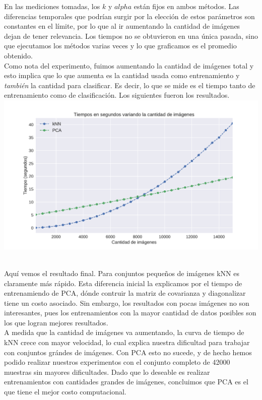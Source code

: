 En las mediciones tomadas, los $k$ y $alpha$ están fijos en ambos métodos. Las diferencias temporales que podrían surgir por la elección de estos parámetros son constantes en el límite, por lo que al ir aumentando la cantidad de imágenes dejan de tener relevancia. Los tiempos no se obtuvieron en una única pasada, sino que ejecutamos los métodos varias veces y lo que graficamos es el promedio obtenido. \\

Como nota del experimento, fuimos aumentando la cantidad de imágenes total y esto implica que lo que aumenta es la cantidad usada como entrenamiento y \textit{también} la cantidad para clasificar. Es decir, lo que se mide es el tiempo tanto de entrenamiento como de clasificación. Los siguientes fueron los resultados. \\

{\centering
    \includegraphics[scale=0.60]{informe/imagenes/tiemposKnnVsPsa.pdf} \\
}
$ $\newline

Aquí vemos el resultado final. Para conjuntos pequeños de imágenes kNN es claramente más rápido. Esta diferencia inicial la explicamos por el tiempo de entrenamiendo de PCA, dónde contruir la matriz de covarianza y diagonalizar tiene un costo asociado. Sin embargo, los resultados con pocas imágenes no son interesantes, pues los entrenamientos con la mayor cantidad de datos posibles son los que logran mejores resultados. \\

A medida que la cantidad de imágenes va aumentando, la curva de tiempo de kNN crece con mayor velocidad, lo cual explica nuestra dificultad para trabajar con conjuntos grándes de imágenes. Con PCA esto no sucede, y de hecho hemos podido realizar nuestros experimentos con el conjunto completo de 42000 muestras sin mayores dificultades. Dado que lo deseable es realizar entrenamientos con cantidades grandes de imágenes, concluimos que PCA es el que tiene el mejor costo computacional. \\

